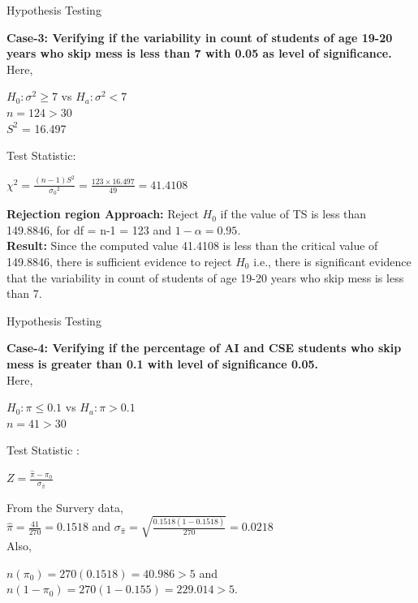 \documentclass{beamer}
\begin{document}
\begin{frame}{Hypothesis Testing}
\begin{block}{}
\textbf{Case-3: Verifying if the variability in count of students of age 19-20 years who skip mess is less than 7 with 0.05 as level of significance.}\\
Here, 
\begin{center}
$H_0 : \sigma^2 \geq 7$ vs $H_a : \sigma^2 < 7$\\
$n = 124 > 30$\\
$S^2$ = 16.497
\end{center}
Test Statistic:
\begin{center}
$\chi^2 = \frac{(n-1){S^2}}{{\sigma_0}^2} = \frac{123\times16.497}{49} = 41.4108$
\end{center}
\textbf{Rejection region Approach:} 
Reject $H_0$ if the value of TS is less than 149.8846, for df = n-1 = 123 and $1 - \alpha = 0.95$.\\
\textbf{Result:}
Since the computed value 41.4108 is less than the critical value of 149.8846, there is sufficient evidence to reject $H_0$ i.e., there is significant evidence that the variability in count of students of age 19-20 years who skip mess is less than 7.
\end{block}
\end{frame}

\begin{frame}{Hypothesis Testing}
\begin{block}{}
\textbf{Case-4: Verifying if the percentage of AI and CSE students who skip mess is greater than 0.1 with level of significance 0.05.}\\
Here,
\begin{center}
$H_0 : \pi \leq 0.1$ vs $H_a : \pi > 0.1$\\
$n = 41 > 30$
\end{center}
Test Statistic :
\begin{center}
$Z = \frac{\hat{\pi}-{\pi_0}}{\sigma_{\hat{\pi}}}$
\end{center}
From the Survery data,\\
$\hat{\pi} = \frac{41}{270} = 0.1518$ and $\sigma_{\hat{\pi}} = \sqrt{\frac{0.1518(1-0.1518)}{270}} = 0.0218$\\
Also, 
\begin{center}
$n(\pi_0) = 270(0.1518) = 40.986 > 5$ and $n(1-\pi_0) = 270(1-0.155) = 229.014 > 5.$
\end{center}
\end{block}
\end{frame}
\end{document}
